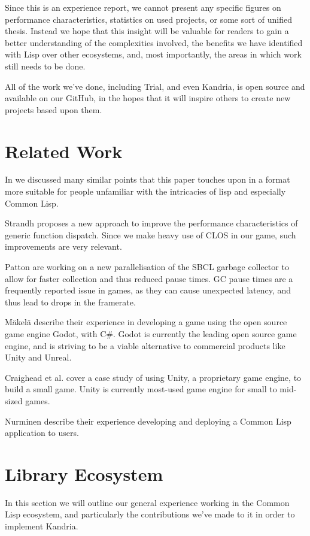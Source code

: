 \documentclass[format=sigconf]{acmart}
\begin{document}
Since this is an experience report, we cannot present any specific figures on performance characteristics, statistics on used projects, or some sort of unified thesis. Instead we hope that this insight will be valuable for readers to gain a better understanding of the complexities involved, the benefits we have identified with Lisp over other ecosystems, and, most importantly, the areas in which work still needs to be done.

All of the work we've done, including Trial, and even Kandria, is open source and available on our GitHub\cite{github}, in the hopes that it will inspire others to create new projects based upon them.

\section{Related Work}\label{relatedwork}
In \cite{hafner2021} we discussed many similar points that this paper touches upon in a format more suitable for people unfamiliar with the intricacies of lisp and especially Common Lisp.

Strandh\cite{strandh2014fast} proposes a new approach to improve the performance characteristics of generic function dispatch. Since we make heavy use of CLOS in our game, such improvements are very relevant.

Patton\cite{swcl-gc} are working on a new parallelisation of the SBCL garbage collector to allow for faster collection and thus reduced pause times. GC pause times are a frequently reported issue in games, as they can cause unexpected latency, and thus lead to drops in the framerate.

Mäkelä\cite{makela2021development} describe their experience in developing a game using the open source game engine Godot, with C\#. Godot is currently the leading open source game engine, and is striving to be a viable alternative to commercial products like Unity and Unreal.

Craighead et al.\cite{craighead2008using} cover a case study of using Unity, a proprietary game engine, to build a small game. Unity is currently most-used game engine for small to mid-sized games.

Nurminen\cite{nurminen1990rft} describe their experience developing and deploying a Common Lisp application to users.

\section{Library Ecosystem}\label{yaks}
In this section we will outline our general experience working in the Common Lisp ecosystem, and particularly the contributions we've made to it in order to implement Kandria.
\end{document}
